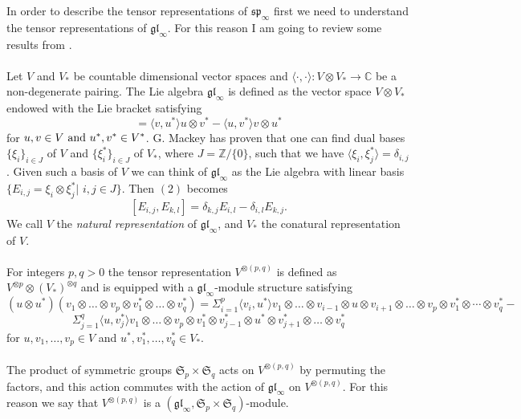 \normalsize In order to describe the tensor representations of $\mathfrak{sp}_{\infty}$ first we need to understand  the tensor representations of $\mathfrak{gl}_{\infty}$. For this reason I am going to review some results from \cite{styrk}.\\ \\Let $V$ and $V_*$ be countable dimensional vector spaces and $\langle \cdot,\cdot \rangle : V \otimes V_{*} \rightarrow \mathbb{C}$ be a non-degenerate pairing. The Lie algebra $\mathfrak{gl}_\infty$ is defined as the vector space $V\otimes V_{*}$ endowed with the Lie bracket satisfying
\begin{equation}
[u\otimes u^{*},v\otimes v^{*}]=\langle v, u^*\rangle u\otimes v^*-\langle u,v^*\rangle v \otimes u^*
\end{equation}
for $u,v\in V \textnormal{ and } u^*,v^* \in V^*$.
G. Mackey \cite{mackey} has proven that one can find dual bases $ \{\xi_i\}_{i \in J}$ of $V$ and $\{\xi^{*}_i\}_{i \in J}$ of $V_*$, where $J=\mathbb{Z}/\{0\}$, such that we have  $\langle \xi_i , \xi_{j}^{*} \rangle=\delta_{i,j}$. Given such a basis of $V$ we can think of $\mathfrak{gl}_{\infty}$ as the Lie algebra with linear basis $\{E_{i,j}=\xi_i \otimes \xi_{j}^{*}| $ $i,j\in J \}$. Then $(2)$ becomes $$[E_{i,j},E_{k,l}]=\delta_{k,j}E_{i,l}-\delta_{i,l}E_{k,j}.$$
We call $V$ the \emph{natural representation} of $\mathfrak{gl}_{\infty}$, and $V_*$ the conatural representation of $V$.\\ \\For integers $p,q>0$ the tensor representation $V^{\otimes(p,q)}$ is defined as $V^{ \otimes p} \otimes(V _{*})^{\otimes q}$ and is equipped with a $\mathfrak{gl}_{\infty}$-module structure satisfying
$$(u\otimes u^*)(v_1 \otimes \dots \otimes v_p \otimes v_1^{*}\otimes\dots \otimes v_q^{*})=
\Sigma_{i=1}^{p}\langle v_i,u^*\rangle v_1 \otimes \dots  \otimes v_{i-1}\otimes u \otimes v_{i+1} \otimes \dots \otimes v_p\otimes v_1^*\otimes \cdots \otimes v_q^* -$$
$$\Sigma_{j=1}^{q}\langle u, v_j^*\rangle v_1\otimes\dots \otimes v_p\otimes v_1^*\otimes v_{j-1}^*\otimes u^* \otimes v_{j+1}^* \otimes \dots \otimes v_q^*$$ for $u,v_1, \dots, v_p \in V$ and $u^*,v_1^*,\dots, v_q^*\in V_*.$\\ \\The product of symmetric groups $\mathfrak{S}_p \times \mathfrak{S}_q$ acts on $V^{\otimes(p,q)}$ by permuting the factors, and this action commutes with the action of $\mathfrak{gl}_{\infty}$ on $V^{\otimes (p,q)}$. For this reason we say that $V^{\otimes (p,q)}$ is a $(\mathfrak{gl}_{\infty},\mathfrak{S}_p\times \mathfrak{S}_q)$-module.
